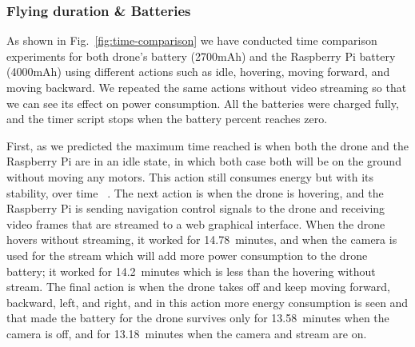 \documentclass[../main.tex]{subfiles}
\begin{document}
\subsubsection{Flying duration \& Batteries}

As shown in Fig.~\ref{fig:time-comparison} we have 
conducted time comparison experiments for both drone's
battery (2700mAh) and the Raspberry Pi battery (4000mAh) 
using different actions such as idle, hovering, 
moving forward, and moving backward. We repeated 
the same actions without video streaming so that 
we can see its effect on power consumption. 
All the batteries were charged fully, and the timer 
script stops when the battery percent reaches zero. 

First, as we predicted 
the maximum time reached is when both the drone and 
the Raspberry Pi are in an idle state, in which both case both will 
be on the ground without moving any motors.
This action still consumes energy but with 
its stability, over time ~\cite{Abey18}. 
The next action is when the drone is hovering, and 
the Raspberry Pi is sending navigation control 
signals to the drone and receiving video frames 
that are streamed to a web graphical interface. 
When the drone hovers without streaming, it worked 
for \SI{14.78}{minutes}, and when the camera is used for 
the stream which will add more power consumption to 
the drone battery; it worked for \SI{14.2}{minutes} which 
is less than the hovering without stream. The final 
action is when the drone takes off and keep moving 
forward, backward, left, and right, and in this action 
more energy consumption is seen and that made the 
battery for the drone survives only for \SI{13.58}{minutes}
when the camera is off, and for \SI{13.18}{minutes} 
when the camera and stream are on.
\end{document}
